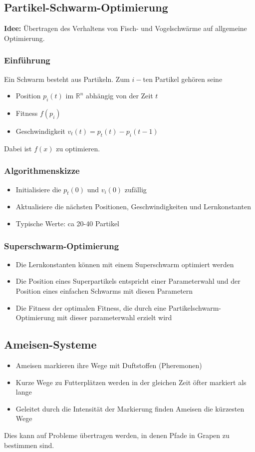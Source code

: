 \subsection{Partikel-Schwarm-Optimierung}
\textbf{Idee:} Übertragen des Verhaltens von Fisch- und Vogelschwärme auf allgemeine Optimierung.

\subsubsection{Einführung}
Ein Schwarm besteht aus Partikeln. Zum \(i-\)ten Partikel gehören seine
\begin{itemize}
	\item Position \(p_i(t)\) im \(\mathbb{R}^n\) abhängig von der Zeit \(t\)
	\item Fitness \(f(p_i)\)
	\item Geschwindigkeit \(v_t(t) = p_t(t)-p_i(t-1)\)
\end{itemize}
Dabei ist \(f(x)\) zu optimieren.

\subsubsection{Algorithmenskizze}
\begin{itemize}
	\item Initialisiere die \(p_t(0)\) und \(v_i(0)\) zufällig
	\item Aktualisiere die nächsten Positionen, Geschwindigkeiten und Lernkonstanten
	\item Typische Werte: ca 20-40 Partikel
\end{itemize}

\subsubsection{Superschwarm-Optimierung}
\begin{itemize}
	\item Die Lernkonstanten können mit einem Superschwarm optimiert werden
	\item Die Position eines Superpartikels entspricht einer Parameterwahl und der Position eines einfachen Schwarms mit diesen Parametern
	\item Die Fitness der optimalen Fitness, die durch eine Partikelschwarm-Optimierung mit dieser parameterwahl erzielt wird
\end{itemize}


\subsection{Ameisen-Systeme}
\begin{itemize}
	\item Ameisen markieren ihre Wege mit Duftstoffen (Pheremonen)
	\item Kurze Wege zu Futterplätzen werden in der gleichen Zeit öfter markiert als lange
	\item Geleitet durch die Intensität der Markierung finden Ameisen die kürzesten Wege
\end{itemize}
Dies kann auf Probleme übertragen werden, in denen Pfade in Grapen zu bestimmen sind.

